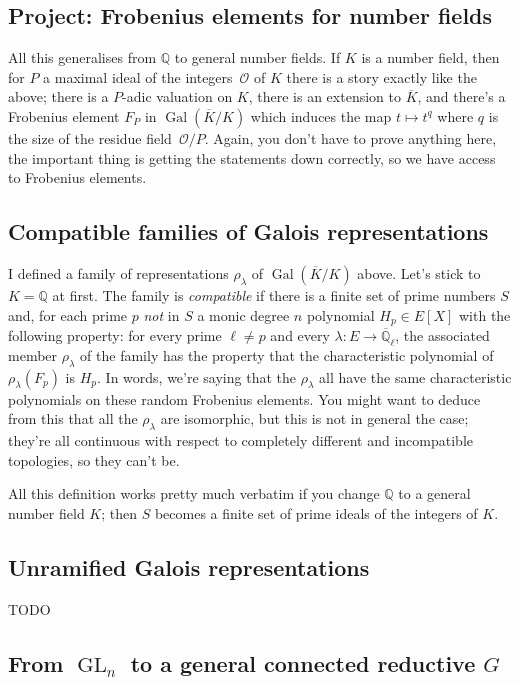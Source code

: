 \documentclass{amsart}
\newcommand{\Q}{\mathbb{Q}}
\DeclareMathOperator{\GL}{GL}
\DeclareMathOperator{\Gal}{Gal}
\begin{document}
\subsection{Project: Frobenius elements for number fields}

All this generalises from $\Q$ to general number fields. If $K$ is a number field, then for $P$ a maximal ideal of the integers~$\mathcal{O}$ of $K$ there is a story exactly like the above; there is a $P$-adic valuation on $K$, there is an extension to $\overline{K}$, and there's a Frobenius element $F_P$ in $\Gal(\overline{K}/K)$ which induces the map $t\mapsto t^q$ where $q$ is the size of the residue field~$\mathcal{O}/P$. Again, you don't have to prove anything here, the important thing is getting the statements down correctly, so we have access to Frobenius elements.

\subsection{Compatible families of Galois representations}

I defined a family of representations $\rho_\lambda$ of $\Gal(\overline{K}/K)$ above. Let's stick to $K=\Q$ at first. The family is \emph{compatible} if there is a finite set of prime numbers $S$ and, for each prime $p$ \emph{not} in $S$ a monic degree $n$ polynomial $H_p\in E[X]$ with the following property: for every prime $\ell\not=p$ and every $\lambda : E\to\overline{\Q}_\ell$, the associated member $\rho_\lambda$ of the family has the property that the characteristic polynomial of $\rho_{\lambda}(F_p)$ is $H_p$. In words, we're saying that the $\rho_\lambda$ all have the same characteristic polynomials on these random Frobenius elements. You might want to deduce from this that all the $\rho_\lambda$ are isomorphic, but this is not in general the case; they're all continuous with respect to completely different and incompatible topologies, so they can't be.

All this definition works pretty much verbatim if you change $\Q$ to a general number field $K$; then $S$ becomes a finite set of prime ideals of the integers of $K$.

\subsection{Unramified Galois representations}

TODO

\subsection{From $\GL_n$ to a general connected reductive $G$}
\end{document}
